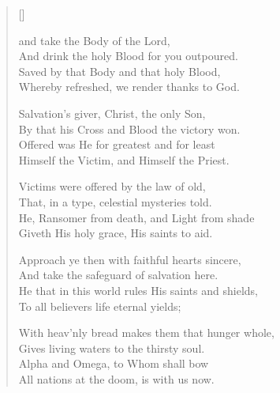 \newHymn


\begin{verse}[\versewidth]

 and take the Body of the Lord,\\
And drink the holy Blood for you outpoured.\\
Saved by that Body and that holy Blood,\\
Whereby refreshed, we render thanks to God.

Salvation's giver, Christ, the only Son,\\
By that his Cross and Blood the victory won.\\
Offered was He for greatest and for least\\
Himself the Victim, and Himself the Priest.

Victims were offered by the law of old,\\
That, in a type, celestial mysteries told.\\
He, Ransomer from death, and Light from shade\\
Giveth His holy grace, His saints to aid.

Approach ye then with faithful hearts sincere,\\
And take the safeguard of salvation here.\\
He that in this world rules His saints and shields,\\
To all believers life eternal yields;

With heav'nly bread makes them that hunger whole,\\
Gives living waters to the thirsty soul.\\
Alpha and Omega, to Whom shall bow\\
All nations at the doom, is with us now.

\end{verse}

\Hmeter{}

